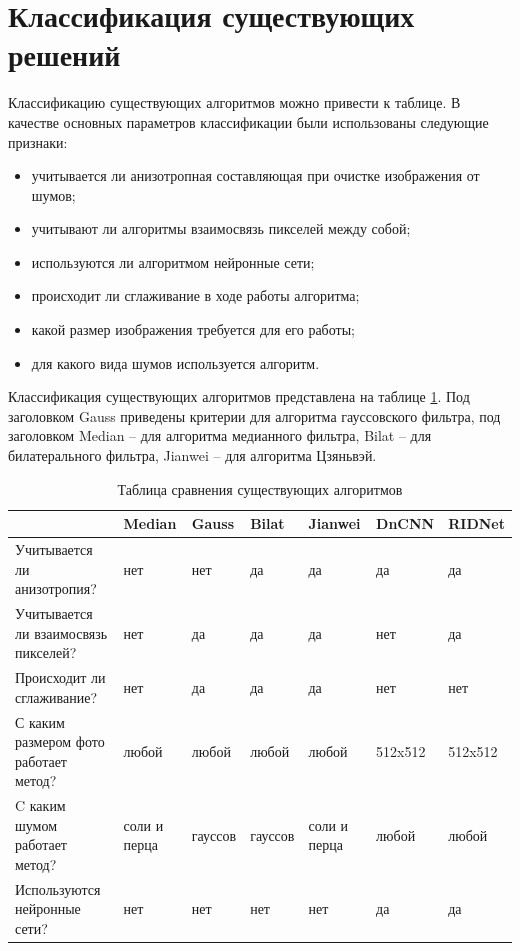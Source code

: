 \newpage
\section{Классификация существующих решений}
Классификацию существующих алгоритмов можно привести к таблице.
В качестве основных параметров классификации были использованы следующие признаки:
\begin{itemize}
	\item учитывается ли анизотропная составляющая при очистке изображения от шумов;
	\item учитывают ли алгоритмы взаимосвязь пикселей между собой;
	\item используются ли алгоритмом нейронные сети;
	\item происходит ли сглаживание в ходе работы алгоритма;
	\item какой размер изображения требуется для его работы;
	\item для какого вида шумов используется алгоритм.
\end{itemize}

Классификация существующих алгоритмов представлена на таблице \ref{table::class}.
Под заголовком Gauss приведены критерии для алгоритма гауссовского фильтра, под заголовком Median -- для алгоритма медианного фильтра, Bilat -- для билатерального фильтра, Jianwei -- для алгоритма Цзяньвэй.
\FloatBarrier
\begin{table}[h]
	\caption{Таблица сравнения существующих алгоритмов}
	\centering
	\begin{tabular}{ | p{3.7cm} | p{1.6cm} | p{1.7cm} | p{1.7cm} | p{1.5cm} | p{1.7cm}| p{1.7cm} |}
		\hline
		 			 & Median  & Gauss & Bilat & Jianwei & DnCNN &  RIDNet \\ 
		\hline
		Учитывается ли
		анизотропия?     & нет          & нет	  	 &  да        &	да & да & да \\
		\hline
		Учитывается ли взаимосвязь пикселей?   & нет  & да  	 &  да	   &	да		& нет & да \\
		\hline
		Происходит ли сглаживание? & нет 	& да & да & да & нет &  нет	   \\
		\hline
		С каким размером фото работает метод?  & любой 	& любой & любой & любой	& 512x512 & 512x512 \\
		\hline
		C каким шумом работает метод?  & соли и перца & гауссов &  гауссов	& соли и перца & любой & любой \\
		\hline
		Используются нейронные сети?  & нет 	& нет 		 &  нет	   &	нет		& да & да \\
		\hline
	\end{tabular}
\label{table::class}
\end{table}